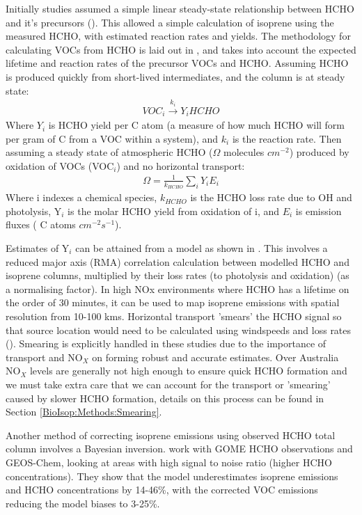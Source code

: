   Initially studies assumed a simple linear steady-state relationship between HCHO and it's precursors (\cite{Palmer2003, Palmer2006, Millet2006}).
  This allowed a simple calculation of isoprene using the measured HCHO, with estimated reaction rates and yields.
  The methodology for calculating VOCs from HCHO is laid out in \cite{Palmer2003}, and takes into account the expected lifetime and reaction rates of the precursor VOCs and HCHO.
  Assuming HCHO is produced quickly from short-lived intermediates, and the column is at steady state:
  \begin{eqnarray*}
    VOC_i \overset{k_i}{\rightarrow} Y_i HCHO
  \end{eqnarray*}
  Where $Y_i$ is HCHO yield per C atom (a measure of how much HCHO will form per gram of C from a VOC within a system), and $k_i$ is the reaction rate.
  Then assuming a steady state of atmospheric HCHO ($\Omega$ molecules $cm^{-2}$) produced by oxidation of VOCs (VOC$_i$) and no horizontal transport:
  \begin{eqnarray*}
    \Omega = \frac{1}{k_{HCHO}} \sum_{i} Y_i E_i
  \end{eqnarray*}
  Where i indexes a chemical species, $k_{HCHO}$ is the HCHO loss rate due to OH and photolysis, Y$_i$ is the molar HCHO yield from oxidation of i, and $E_i$ is emission fluxes ( C atoms $cm^{-2}s^{-1}$).
  
  Estimates of Y$_i$ can be attained from a model as shown in \cite{Millet2006}.
  This involves a reduced major axis (RMA) correlation calculation between modelled HCHO and isoprene columns, multiplied by their loss rates (to photolysis and oxidation) (as a normalising factor).  
  In high NOx environments where HCHO has a lifetime on the order of 30 minutes, it can be used to map isoprene emissions with spatial resolution from 10-100 kms.
  Horizontal transport 'smears' the HCHO signal so that source location would need to be calculated using windspeeds and loss rates (\cite{Palmer2001,Palmer2003}).
  Smearing is explicitly handled in these studies due to the importance of transport and NO$_X$ on forming robust and accurate estimates.
  Over Australia NO$_X$ levels are generally not high enough to ensure quick HCHO formation and we must take extra care that we can account for the transport or 'smearing' caused by slower HCHO formation, details on this process can be found in Section \ref{BioIsop:Methods:Smearing}.
  
  Another method of correcting isoprene emissions using observed HCHO total column involves a Bayesian inversion.
  \cite{Shim2005} work with GOME HCHO observations and GEOS-Chem, looking at areas with high signal to noise ratio (higher HCHO concentrations).
  They show that the model underestimates isoprene emissions and HCHO concentrations by 14-46\%, with the corrected VOC emissions reducing the model biases to 3-25\%.
  
